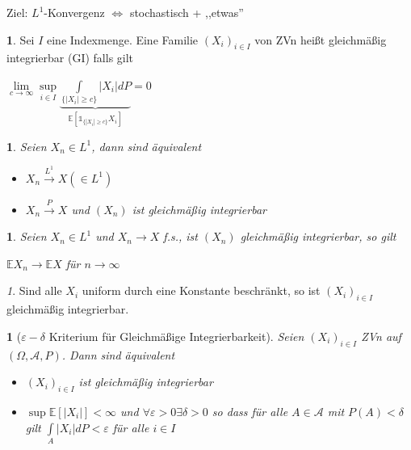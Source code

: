 \documentclass[10pt,a4paper]{report}
\newcommand{\E}{\mathbb{E}}
\numberwithin{equation}{section}
\numberwithin{figure}{section}
\theoremstyle{plain}
\theoremstyle{definition}
\newtheorem{defn}[thm]{\protect\definitionname}
\theoremstyle{remark}
\newtheorem{rem}[thm]{\protect\remarkname}
\theoremstyle{plain}
\newtheorem{prop}[thm]{\protect\propositionname}
\newtheorem{cor}[thm]{\protect\corollaryname}
\providecommand{\corollaryname}{Korollar}
\providecommand{\definitionname}{Definition}
\providecommand{\propositionname}{Satz}
\providecommand{\remarkname}{Bemerkung}
\newcommand{\1}{ \mathbb{1} } %
\begin{document}
Ziel: $L^1$-Konvergenz $\Leftrightarrow$ stochastisch + ,,etwas''
\begin{defn}
  Sei $I$ eine Indexmenge. Eine Familie $(X_i)_{i \in I}$ von ZVn
  heißt gleichmäßig integrierbar (GI) falls gilt
  \begin{center}
    $\lim\limits_{c \to \infty} \sup\limits_{i \in I}
    \underbrace{\int\limits_{\{|X_i|\geq
        c\}}|X_i|dP}_{\E[\1_{\{|X_i|\geq c\}}X_i]}=0 $
  \end{center}
\end{defn}
\begin{prop}   
\label{prop:LkonvergenzUndPkonvergenz}
  Seien $X_n \in L^1$, dann sind äquivalent
  \begin{itemize}
  \item[i)] $X_n \overset{L^1}{\to} X (\in L^1)$
  \item[ii)] $X_n \overset{P}{\to} X$ und $(X_n)$ ist gleichmäßig integrierbar
  \end{itemize}
\end{prop}
\begin{cor}
  Seien $X_n \in L^1$ und $X_n \to X$ f.s., ist $(X_n)$ gleichmäßig integrierbar, so gilt
  \begin{center}
    $\E X_n \to \E X$ für $n \to \infty$
  \end{center}
\end{cor}
\begin{rem}
  Sind alle $X_i$ uniform durch eine Konstante beschränkt, so ist $(X_i)_{i \in I}$ gleichmäßig integrierbar.
\end{rem}
\begin{prop} [$\varepsilon - \delta$ Kriterium für Gleichmäßige Integrierbarkeit]
  Seien $(X_i)_{i \in I}$ ZVn auf $(\Omega, \mathcal{A},P)$. Dann sind
  äquivalent
  \begin{itemize}
  \item[i)] $(X_i)_{i \in I}$ ist gleichmäßig integrierbar
  \item[ii)] $\sup \E [|X_i|]< \infty$ und $\forall \varepsilon > 0
    \exists \delta >0$ so dass für alle $A \in \mathcal{A}$ mit $P(A)<
    \delta$ gilt $\int\limits_A |X_i|dP<\varepsilon$ für alle $i \in I$
  \end{itemize}
\end{prop}
\end{document}
